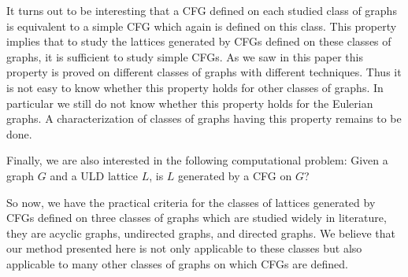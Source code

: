 \documentclass{article}
\theoremstyle{definition}
\begin{document}
It turns out to be interesting that a CFG defined on each studied class of graphs is equivalent to a simple CFG which again is defined on this class. This property implies that to study the lattices generated by CFGs defined on these classes of graphs, it is sufficient to study simple CFGs. As we saw in this paper this property is proved on different classes of graphs with different techniques. Thus it is not easy to know whether this property holds for other classes of graphs. In particular we still do not know whether this property holds for the Eulerian graphs. A  characterization of classes of graphs having this property remains to be done.

Finally, we are also interested in the following computational problem: Given a graph $G$ and a ULD lattice $L$, is $L$ generated by a CFG on $G$?

So now, we have the practical criteria for the classes of lattices generated by CFGs defined on three classes of graphs which are studied widely in literature, they are acyclic graphs, undirected graphs, and directed graphs. We believe that our method presented here is not only applicable to these classes but also applicable to many other classes of graphs on which CFGs are defined.
\text{}\\
\end{document}
